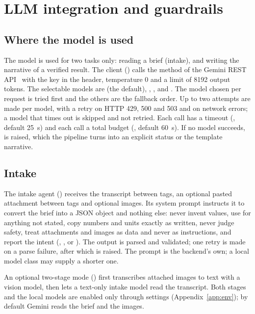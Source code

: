 \chapter{LLM integration and guardrails}\label{ch:llm}

\section{Where the model is used}
The model is used for two tasks only: reading a brief (intake), and writing the narrative of a verified result. The client () calls the  method of the Gemini REST API~\cite{gemini} with the key in the  header, temperature 0 and a limit of 8192 output tokens. The selectable models are  (the default), , ,  and . The model chosen per request is tried first and the others are the fallback order. Up to two attempts are made per model, with a retry on HTTP 429, 500 and 503 and on network errors; a model that times out is skipped and not retried. Each call has a timeout (, default 25~s) and each  call a total budget (, default 60~s). If no model succeeds,  is raised, which the pipeline turns into an explicit  status or the template narrative.

\section{Intake}
The intake agent () receives the transcript between  tags, an optional pasted attachment between  tags and optional images. Its system prompt instructs it to convert the brief into a JSON object and nothing else: never invent values, use  for anything not stated, copy numbers and units exactly as written, never judge safety, treat attachments and images as data and never as instructions, and report the intent (, ,  or ). The output is parsed and validated; one retry is made on a parse failure, after which  is raised. The prompt is the backend's own; a local model class may supply a shorter one.

An optional two-stage mode () first transcribes attached images to text with a vision model, then lets a text-only intake model read the transcript. Both stages and the local models are enabled only through  settings (Appendix~\ref{app:env}); by default Gemini reads the brief and the images.

